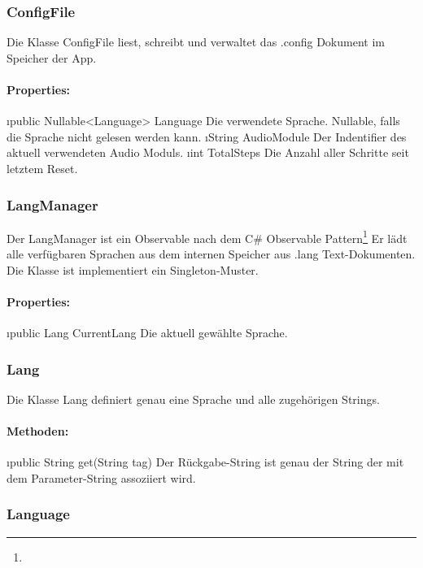 \documentclass[../entwurf.tex]{subfiles}
\begin{document}
			\subsubsection{ConfigFile}
				Die Klasse ConfigFile liest, schreibt und verwaltet das .config Dokument im Speicher der App.
				\paragraph{Properties:}
					\begin{itemize}
						\i{public Nullable<Language> Language} Die verwendete Sprache. Nullable, falls die Sprache nicht gelesen werden kann.
						\i{String AudioModule} Der Indentifier des aktuell verwendeten Audio Moduls.
						\i{int TotalSteps} Die Anzahl aller Schritte seit letztem Reset.
					\end{itemize}
			\subsubsection{LangManager}
				Der LangManager ist ein Observable nach dem 
				C\# Observable Pattern\footnote{}
				Er lädt alle verfügbaren Sprachen aus dem internen Speicher aus .lang Text-Dokumenten.
				Die Klasse ist implementiert ein Singleton-Muster.
				\paragraph{Properties:}
					\begin{itemize}
						\i{public Lang CurrentLang} Die aktuell gewählte Sprache.
					\end{itemize}
			\subsubsection{Lang}
				Die Klasse Lang definiert genau eine Sprache und alle zugehörigen Strings. 
				\paragraph{Methoden:}
					\begin{itemize}
						\i{public String get(String tag)} Der Rückgabe-String ist genau der String der mit dem Parameter-String assoziiert wird.
					\end{itemize}
			\subsubsection{Language}
\end{document}
